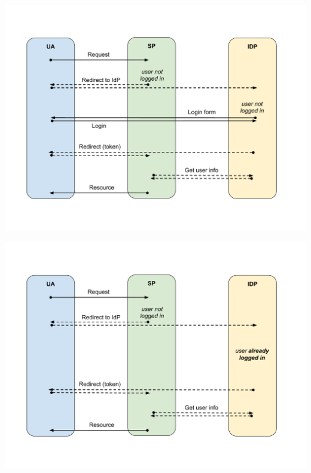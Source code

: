 \documentclass[ignorenonframetext,aspectratio=169]{beamer}
\begin{document}
\begin{frame}[plain]
\centering
\includegraphics[height=\paperheight]{fedsso-proto-6.pdf}
\end{frame}

\begin{frame}[plain]
\centering
\includegraphics[height=\paperheight]{fedsso-proto-7.pdf}
\end{frame}
\end{document}
